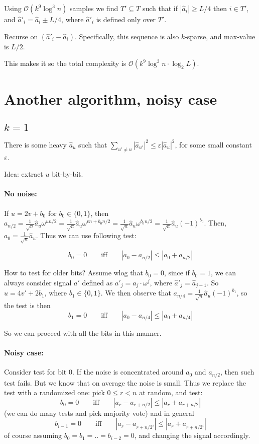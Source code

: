 \documentclass[11pt]{article}
\newcommand{\bigo}{\mathcal{O}}
\begin{document}
Using $\bigo(k^9 \log^3 n)$ samples we find $T' \subseteq T$ such that if $|\hat{a}_i| \ge L/4$ then $i \in T'$, and $\hat{a}'_i = \hat{a}_i \pm L/4$, where $\hat{a}'_i$ is defined only over $T'$.

Recurse on $(\hat{a}'_i - \hat{a}_i)$. Specifically, this sequence is also $k$-sparse, and max-value is $L/2$.

This makes it so the total complexity is $\bigo(k^9 \log^3 n \cdot \log_2 L)$. 

\section{Another algorithm, noisy case \cite{DBLP:conf/hpec/LetourneauLL16} \cite{DBLP:journals/sivp/ErmeydanC18}}
\subsection{$k=1$}

There is some heavy $\hat{a}_u$ such that $\sum_{u' \not = u} |\hat{a}_{u'}|^2 \le \varepsilon |\hat{a}_u|^2$, for some small constant $\varepsilon$.

Idea: extract $u$ bit-by-bit.
\paragraph{No noise:} If $u = 2v + b_0$ for $b_0 \in \{0,1\}$, then $a_{n/2} = \frac{1}{\sqrt{n}} \hat{a}_u\omega^{u n/2} =\frac{1}{\sqrt{n}}  \hat{a}_u \omega^{vn + b_0n/2} = \frac{1}{\sqrt{n}} \hat{a}_u \omega^{b_0n/2} = \frac{1}{\sqrt{n}} \hat{a}_u (-1)^{b_0}$.
Then, $a_0 = \frac{1}{\sqrt{n}} \hat{a}_u$. Thus we can use following test:

$$b_0 = 0 \quad\quad\text{iff}\quad\quad |a_0 - a_{n/2}| \le |a_0 + a_{n/2}|$$

How to test for older bits? Assume wlog that $b_0 = 0$, since if $b_0 = 1$, we can always consider signal $a'$ defined as $a'_j = a_j \cdot \omega^j$, where $\hat{a}'_j = \hat{a}_{j-1}$.
So $u = 4v' + 2b_1$, where $b_1 \in \{0,1\}$. We then observe that $a_{n/4} = \frac{1}{\sqrt{n}} \hat{a}_u (-1)^{b_1}$, so the test is then
$$b_1 = 0 \quad\quad\text{iff}\quad\quad |a_0 - a_{n/4}| \le |a_0 + a_{n/4}|$$

So we can proceed with all the bits in this manner.

\paragraph{Noisy case:}
Consider test for bit 0. If the noise is concentrated around $a_0$ and $a_{n/2}$, then such test fails. But we know that on average the noise is small. Thus we replace the test with a randomized one: pick $0 \le r < n$ at random, and test:
$$b_0 = 0 \quad\quad\text{iff}\quad\quad |a_{r} - a_{r+n/2}| \le |a_{r} + a_{r+n/2}|$$
(we can do many tests and pick majority vote)
and in general
$$b_{i-1} = 0 \quad\quad\text{iff}\quad\quad |a_r - a_{r+n/2^i}| \le |a_r + a_{r+n/2^i}|$$
of course assuming $b_0=b_1=..=b_{i-2} = 0$, and changing the signal accordingly.
\end{document}
